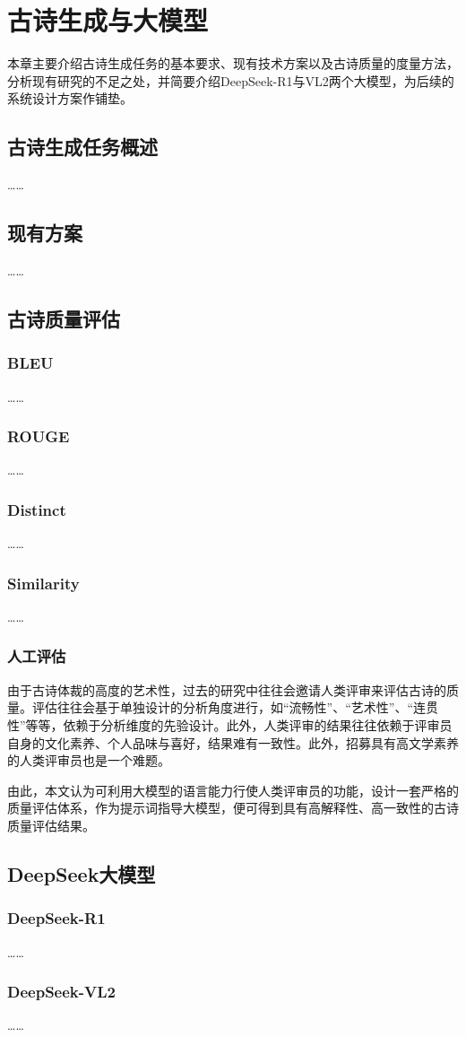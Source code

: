
\chapter{古诗生成与大模型}

本章主要介绍古诗生成任务的基本要求、现有技术方案以及古诗质量的度量方法，分析现有研究的不足之处，并简要介绍DeepSeek-R1与VL2两个大模型，为后续的系统设计方案作铺垫。

\section{古诗生成任务概述}
……
\section{现有方案}
……
\section{古诗质量评估}
\subsection{BLEU}
……
\subsection{ROUGE}
……
\subsection{Distinct}
……
\subsection{Similarity}
……
\subsection{人工评估}

由于古诗体裁的高度的艺术性，过去的研究中往往会邀请人类评审来评估古诗的质量。评估往往会基于单独设计的分析角度进行，如“流畅性”、“艺术性”、“连贯性”等等，依赖于分析维度的先验设计。此外，人类评审的结果往往依赖于评审员自身的文化素养、个人品味与喜好，结果难有一致性。此外，招募具有高文学素养的人类评审员也是一个难题。

由此，本文认为可利用大模型的语言能力行使人类评审员的功能，设计一套严格的质量评估体系，作为提示词指导大模型，便可得到具有高解释性、高一致性的古诗质量评估结果。

\section{DeepSeek大模型}
\subsection{DeepSeek-R1}
……
\subsection{DeepSeek-VL2}
……
